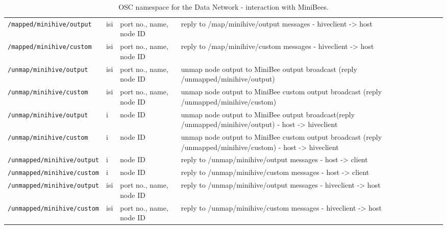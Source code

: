 \documentclass[letterpaper,10pt]{article}
\begin{document}
\begin{sidewaystable}[!tbp]
\begin{center}
\begin{tabular}{|llll|}
\verb|/mapped/minihive/output| & isi & port no., name, node ID & reply to /map/minihive/output messages - hiveclient -> host \\
\verb|/mapped/minihive/custom| & isi & port no., name, node ID & reply to /map/minihive/custom messages - hiveclient -> host \\
\hline
\verb|/unmap/minihive/output| & isi & port no., name, node ID & unmap node output to MiniBee output broadcast (reply /unmapped/minihive/output)\\
\verb|/unmap/minihive/custom| & isi & port no., name, node ID & unmap node output to MiniBee custom output broadcast (reply /unmapped/minihive/custom)\\
\verb|/unmap/minihive/output| & i & node ID & unmap node output to MiniBee output broadcast(reply /unmapped/minihive/output) - host -> hiveclient\\
\verb|/unmap/minihive/custom| & i & node ID & unmap node output to MiniBee custom output broadcast (reply /unmapped/minihive/custom) - host -> hiveclient\\
\verb|/unmapped/minihive/output| & i & node ID & reply to /unmap/minihive/output messages - host -> client\\
\verb|/unmapped/minihive/custom| & i & node ID & reply to /unmap/minihive/custom messages - host -> client \\
\verb|/unmapped/minihive/output| & isi & port no., name, node ID & reply to /unmap/minihive/output messages - hiveclient -> host \\
\verb|/unmapped/minihive/custom| & isi & port no., name, node ID & reply to /unmap/minihive/custom messages - hiveclient -> host \\
\hline

\end{tabular}
\end{center}
\caption{OSC namespace for the Data Network - interaction with MiniBees. }
\label{oscinterfaceMB}
 \end{sidewaystable}
\end{document}
